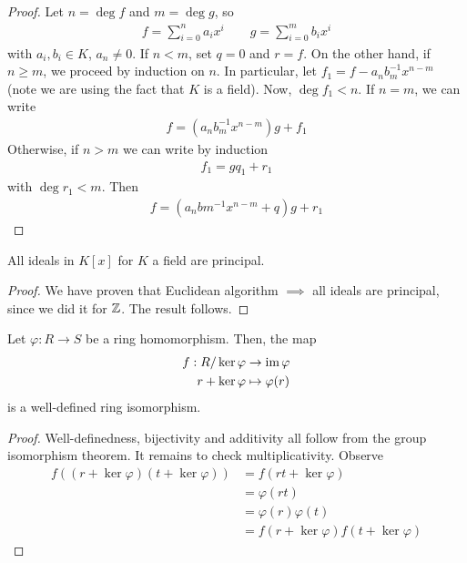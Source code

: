 \documentclass{../template/note}
\begin{document}
    \begin{proof}
        Let $n = \deg f$ and $m = \deg g$, so
        \begin{align*}
            f = \sum_{i=0}^n a_ix^i \qquad g = \sum_{i=0}^m b_ix^i
        \end{align*}
        with $a_i, b_i \in K$, $a_n \neq 0$. If $n < m$, set $q = 0$ and $r = f$. On the other hand, if $n \geq m$, we proceed by induction on $n$. In particular, let $f_1 = f - a_n b_m^{-1} x^{n-m}$ (note we are using the fact that $K$ is a field). Now, $\deg f_1 < n$. If $n = m$, we can write
        \begin{align*}
            f = (a_nb_m^{-1}x^{n-m})g + f_1
        \end{align*}
        Otherwise, if $n > m$ we can write by induction
        \begin{align*}
            f_1 = gq_1 + r_1
        \end{align*}
        with $\deg r_1 < m$. Then
        \begin{align*}
            f = (a_nbm^{-1}x^{n-m}+q)g + r_1
        \end{align*}
    \end{proof}
    
    \begin{corollary*}
        All ideals in $K[x]$ for $K$ a field are principal.
    \end{corollary*}
    
    \begin{proof}
        We have proven that Euclidean algorithm $\implies$ all ideals are principal, since we did it for $\mathbb Z$. The result follows.
    \end{proof}
    
    \begin{theorem}
        Let $\varphi: R \to S$ be a ring homomorphism. Then, the map
        \begin{align*}
            f: R/\ker \varphi &\to \operatorname{im} \varphi \\
            r + \ker \varphi &\mapsto \varphi(r)
        \end{align*}
        is a well-defined ring isomorphism.        
    \end{theorem}
    
    \begin{proof}
        Well-definedness, bijectivity and additivity all follow from the group isomorphism theorem. It remains to check multiplicativity. Observe
        \begin{align*}
            f((r + \ker \varphi)(t + \ker \varphi)) &= f(rt + \ker \varphi) \\
            &= \varphi(rt) \\
            &= \varphi(r) \varphi(t) \\
            &= f(r + \ker \varphi)f(t + \ker \varphi)
        \end{align*}
    \end{proof}
    
\end{document}
